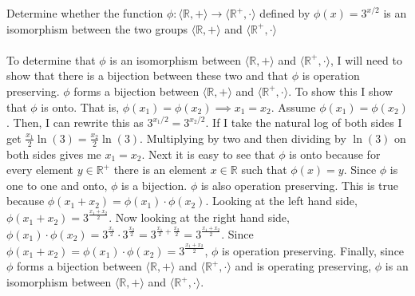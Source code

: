 \documentclass[titlepage]{article}
\newenvironment{problem}[2][Problem]{\begin{trivlist}
\item[\hskip \labelsep {\bfseries #1}\hskip \labelsep {\bfseries #2.}]}{\end{trivlist}}
\begin{document}
\begin{problem}{10}
Determine whether the function $\phi: \langle \mathbb{R},+ \rangle \rightarrow \langle \mathbb{R}^+,\cdot\rangle$ defined by $\phi(x)=3^{x/2}$ is an isomorphism between the two groups $\langle \mathbb{R},+ \rangle$ and $\langle \mathbb{R}^+,\cdot\rangle$
\\ \\
To determine that $\phi$ is an isomorphism between $\langle \mathbb{R},+ \rangle$ and $\langle \mathbb{R}^+,\cdot\rangle$, I will need to show that there is a bijection between these two and that $\phi$ is operation preserving. $\phi$ forms a bijection between $\langle \mathbb{R},+ \rangle$ and $\langle \mathbb{R}^+,\cdot\rangle$. To show this I show that $\phi$ is onto. That is, $\phi(x_1) = \phi(x_2) \implies x_1=x_2$. Assume $\phi(x_1) = \phi(x_2)$. Then, I can rewrite this as $3^{x_1/2} = 3^{x_2/2}$. If I take the natural log of both sides I get $\frac{x_1}{2}\ln(3) = \frac{x_2}{2}\ln(3)$. Multiplying by two and then dividing by $\ln(3)$ on both sides gives me $x_1 = x_2$. Next it is easy to see that $\phi$ is onto because for every element $y \in \mathbb{R}^+$ there is an element $x \in \mathbb{R}$ such that $\phi(x) = y$. Since $\phi$ is one to one and onto, $\phi$ is a bijection. $\phi$ is also operation preserving. This is true because $\phi(x_1+x_2) = \phi(x_1)\cdot\phi(x_2)$. Looking at the left hand side, $\phi(x_1+x_2) = 3^{\frac{x_1+x_2}{2}}$. Now looking at the right hand side, $\phi(x_1) \cdot \phi(x_2) = 3^{\frac{x_1}{2}}\cdot 3^{\frac{x_2}{2}} = 3^{\frac{x_1}{2} + \frac{x_2}{2}} = 3^{\frac{x_1 + x_2}{2}}$. Since $\phi(x_1+x_2) = \phi(x_1)\cdot\phi(x_2) = 3^{\frac{x_1 + x_2}{2}}$, $\phi$ is operation preserving. Finally, since $\phi$ forms a bijection between $\langle \mathbb{R},+ \rangle$ and $\langle \mathbb{R}^+,\cdot\rangle$ and is operating preserving, $\phi$ is an isomorphism between $\langle \mathbb{R},+ \rangle$ and $\langle \mathbb{R}^+,\cdot\rangle$.
\end{problem}
\end{document}
